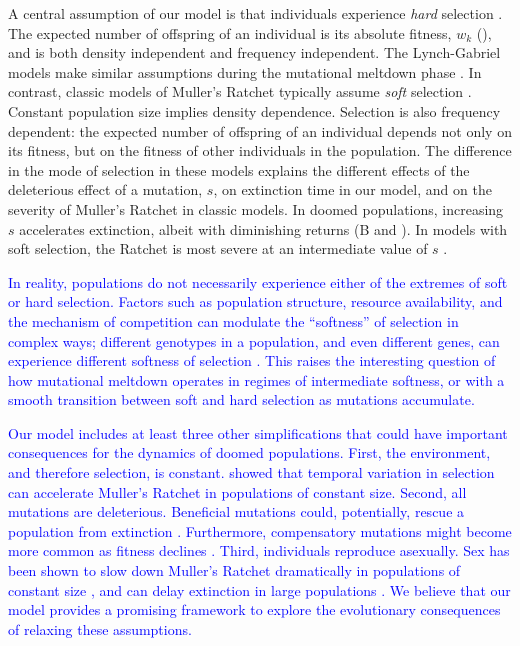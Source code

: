 \documentclass[9pt,lineno]{elife}
\newcommand{\blue}{\textcolor{blue}}
\begin{document}
A central assumption of our model  is that individuals experience \textit{hard} selection \citep{wal75}.   
The expected number of offspring of an individual is its absolute fitness, $w_k$ (), and is both density independent and frequency independent.  The Lynch-Gabriel models make similar assumptions during the mutational meltdown phase \citep{lyn93,lyn95}. 
% 
In contrast, classic models of Muller's Ratchet typically assume \textit{soft} selection \citep{wal75}.  Constant population size implies density dependence.  Selection is also frequency dependent: the expected number of offspring of an individual depends not only on its fitness, but on the fitness of other individuals in the population.
%
The difference in the mode of selection in these models explains the different effects of the deleterious effect of a mutation, $s$, on extinction time in our model, and on the severity of Muller's Ratchet in classic models.  In doomed populations, increasing $s$ accelerates extinction, albeit with diminishing returns (B and ).  In models with soft selection, the Ratchet is most severe at an intermediate value of $s$ 
\citep[C;][]{lyn95, Gordo_On_2000, gor00b}.  

\blue{In reality, populations do not necessarily experience either of the extremes of soft or hard selection.  Factors such as population structure, resource availability, and the mechanism of competition can modulate the ``softness'' of selection in complex ways; different genotypes in a population, and even different genes, can experience different softness of selection \citep{laf10, ho12}.  This raises the interesting question of how mutational meltdown operates in regimes of intermediate softness, or with a smooth transition between soft and hard selection as mutations accumulate.}

\blue{Our model includes at least three other simplifications that could have important consequences for the dynamics of doomed populations.  
%
First, the environment, and therefore selection, is constant.  \citet{Wardlaw_Temporal_2012} showed that temporal variation in selection can accelerate Muller's Ratchet in populations of constant size.
%
Second, all mutations are deleterious.  Beneficial mutations could, potentially, rescue a population from extinction \citep{mar13}.  Furthermore, compensatory mutations might become more common as fitness declines \citep{poo00, sil07}.
%
Third, individuals reproduce asexually.  Sex has been shown to slow down Muller's Ratchet dramatically in populations of constant size \citep{pam87, cha93}, and can delay extinction in large populations \citep{lyn95a}.
%
We believe that our model provides a promising framework to explore the evolutionary consequences of relaxing these assumptions.} 
\end{document}
